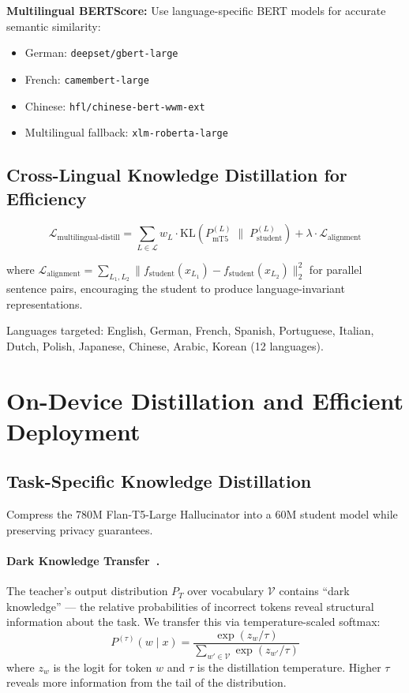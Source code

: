 \documentclass[11pt, a4paper]{article}
\begin{document}
\textbf{Multilingual BERTScore:} Use language-specific BERT models for accurate semantic similarity:
\begin{itemize}[nosep]
  \item German: \texttt{deepset/gbert-large}
  \item French: \texttt{camembert-large}
  \item Chinese: \texttt{hfl/chinese-bert-wwm-ext}
  \item Multilingual fallback: \texttt{xlm-roberta-large}
\end{itemize}

\subsection{Cross-Lingual Knowledge Distillation for Efficiency}

\begin{equation}
\mathcal{L}_{\text{multilingual-distill}} = \sum_{L \in \mathcal{L}} w_L \cdot \text{KL}\!\left(P_{\text{mT5}}^{(L)} \;\|\; P_{\text{student}}^{(L)}\right) + \lambda \cdot \mathcal{L}_{\text{alignment}}
\end{equation}

where $\mathcal{L}_{\text{alignment}} = \sum_{L_1, L_2} \|f_{\text{student}}(x_{L_1}) - f_{\text{student}}(x_{L_2})\|_2^2$ for parallel sentence pairs, encouraging the student to produce language-invariant representations.

Languages targeted: English, German, French, Spanish, Portuguese, Italian, Dutch, Polish, Japanese, Chinese, Arabic, Korean (12 languages).

\section{On-Device Distillation and Efficient Deployment}
\label{sec:distillation}

\subsection{Task-Specific Knowledge Distillation}

Compress the 780M Flan-T5-Large Hallucinator into a 60M student model while preserving privacy guarantees.

\paragraph{Dark Knowledge Transfer~\cite{hinton2015distilling}.}
The teacher's output distribution $P_T$ over vocabulary $\mathcal{V}$ contains ``dark knowledge'' --- the relative probabilities of incorrect tokens reveal structural information about the task. We transfer this via temperature-scaled softmax:
\begin{equation}
P^{(\tau)}(w \mid x) = \frac{\exp(z_w / \tau)}{\sum_{w' \in \mathcal{V}} \exp(z_{w'} / \tau)}
\end{equation}
where $z_w$ is the logit for token $w$ and $\tau$ is the distillation temperature. Higher $\tau$ reveals more information from the tail of the distribution.
\end{document}
